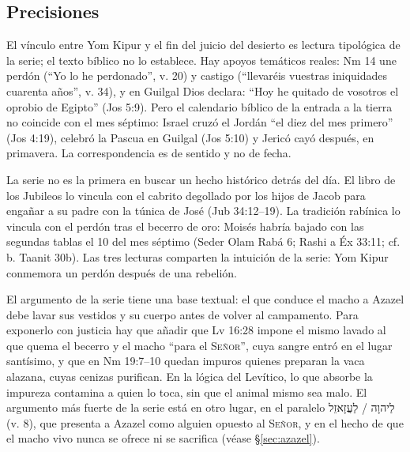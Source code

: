 \documentclass[11pt,letterpaper]{article}
\newcommand{\heb}[1]{\mbox{\foreignlanguage{hebrew}{#1}}}
\newcommand{\SENOR}{\textsc{Señor}}
\begin{document}
\subsection{Precisiones}
\begin{nota}
El vínculo entre Yom Kipur y el fin del juicio del desierto es lectura tipológica de la serie; el texto bíblico no lo establece. Hay apoyos temáticos reales: Nm 14 une perdón (``Yo lo he perdonado'', v. 20) y castigo (``llevaréis vuestras iniquidades cuarenta años'', v. 34), y en Guilgal Dios declara: ``Hoy he quitado de vosotros el oprobio de Egipto'' (Jos 5:9). Pero el calendario bíblico de la entrada a la tierra no coincide con el mes séptimo: Israel cruzó el Jordán ``el diez del mes primero'' (Jos 4:19), celebró la Pascua en Guilgal (Jos 5:10) y Jericó cayó después, en primavera. La correspondencia es de sentido y no de fecha.
\end{nota}

\begin{nota}
La serie no es la primera en buscar un hecho histórico detrás del día. El libro de los Jubileos lo vincula con el cabrito degollado por los hijos de Jacob para engañar a su padre con la túnica de José (Jub 34:12--19). La tradición rabínica lo vincula con el perdón tras el becerro de oro: Moisés habría bajado con las segundas tablas el 10 del mes séptimo (Seder Olam Rabá 6; Rashi a Éx 33:11; cf. b. Taanit 30b). Las tres lecturas comparten la intuición de la serie: Yom Kipur conmemora un perdón después de una rebelión.
\end{nota}

\begin{nota}
El argumento de la serie tiene una base textual: el que conduce el macho a Azazel debe lavar sus vestidos y su cuerpo antes de volver al campamento. Para exponerlo con justicia hay que añadir que Lv 16:28 impone el mismo lavado al que quema el becerro y el macho ``para el \SENOR'', cuya sangre entró en el lugar santísimo, y que en Nm 19:7--10 quedan impuros quienes preparan la vaca alazana, cuyas cenizas purifican. En la lógica del Levítico, lo que absorbe la impureza contamina a quien lo toca, sin que el animal mismo sea malo. El argumento más fuerte de la serie está en otro lugar, en el paralelo \heb{לַיהוָה} / \heb{לַעֲזָאזֵל} (v. 8), que presenta a Azazel como alguien opuesto al \SENOR, y en el hecho de que el macho vivo nunca se ofrece ni se sacrifica (véase §\ref{sec:azazel}).
\end{nota}
\end{document}
